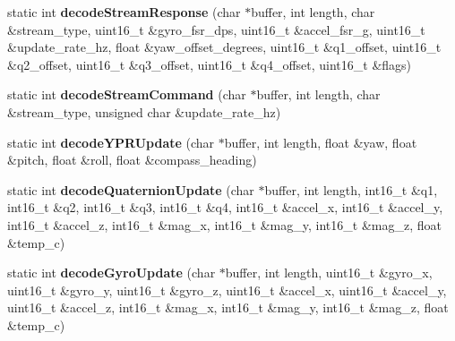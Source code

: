 \begin{DoxyCompactItemize}
\item 
\hypertarget{class_i_m_u_protocol_a97c641e18f3881b989a8f89fcb08458c}{}static int {\bfseries decode\+Stream\+Response} (char $\ast$buffer, int length, char \&stream\+\_\+type, uint16\+\_\+t \&gyro\+\_\+fsr\+\_\+dps, uint16\+\_\+t \&accel\+\_\+fsr\+\_\+g, uint16\+\_\+t \&update\+\_\+rate\+\_\+hz, float \&yaw\+\_\+offset\+\_\+degrees, uint16\+\_\+t \&q1\+\_\+offset, uint16\+\_\+t \&q2\+\_\+offset, uint16\+\_\+t \&q3\+\_\+offset, uint16\+\_\+t \&q4\+\_\+offset, uint16\+\_\+t \&flags)\label{class_i_m_u_protocol_a97c641e18f3881b989a8f89fcb08458c}

\item 
\hypertarget{class_i_m_u_protocol_af6c852e5e0fc5fe540d23920e0e2d3a0}{}static int {\bfseries decode\+Stream\+Command} (char $\ast$buffer, int length, char \&stream\+\_\+type, unsigned char \&update\+\_\+rate\+\_\+hz)\label{class_i_m_u_protocol_af6c852e5e0fc5fe540d23920e0e2d3a0}

\item 
\hypertarget{class_i_m_u_protocol_a2a833cb88f11b50e16001e8197ab1664}{}static int {\bfseries decode\+Y\+P\+R\+Update} (char $\ast$buffer, int length, float \&yaw, float \&pitch, float \&roll, float \&compass\+\_\+heading)\label{class_i_m_u_protocol_a2a833cb88f11b50e16001e8197ab1664}

\item 
\hypertarget{class_i_m_u_protocol_a2706f477f4b02197d09d55e436b24fd7}{}static int {\bfseries decode\+Quaternion\+Update} (char $\ast$buffer, int length, int16\+\_\+t \&q1, int16\+\_\+t \&q2, int16\+\_\+t \&q3, int16\+\_\+t \&q4, int16\+\_\+t \&accel\+\_\+x, int16\+\_\+t \&accel\+\_\+y, int16\+\_\+t \&accel\+\_\+z, int16\+\_\+t \&mag\+\_\+x, int16\+\_\+t \&mag\+\_\+y, int16\+\_\+t \&mag\+\_\+z, float \&temp\+\_\+c)\label{class_i_m_u_protocol_a2706f477f4b02197d09d55e436b24fd7}

\item 
\hypertarget{class_i_m_u_protocol_a39d4917878a4af8a173962c1991bbb95}{}static int {\bfseries decode\+Gyro\+Update} (char $\ast$buffer, int length, uint16\+\_\+t \&gyro\+\_\+x, uint16\+\_\+t \&gyro\+\_\+y, uint16\+\_\+t \&gyro\+\_\+z, uint16\+\_\+t \&accel\+\_\+x, uint16\+\_\+t \&accel\+\_\+y, uint16\+\_\+t \&accel\+\_\+z, int16\+\_\+t \&mag\+\_\+x, int16\+\_\+t \&mag\+\_\+y, int16\+\_\+t \&mag\+\_\+z, float \&temp\+\_\+c)\label{class_i_m_u_protocol_a39d4917878a4af8a173962c1991bbb95}

\end{DoxyCompactItemize}
